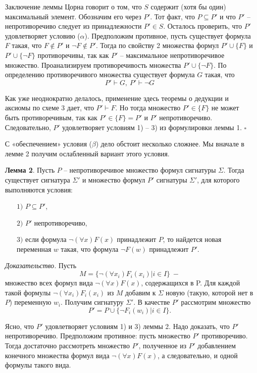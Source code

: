 \documentclass[a4paper]{article}
\begin{document}
Заключение леммы Цорна говорит о том, что $S$ содержит (хотя бы один) максимальный элемент. Обозначим его через $P'$. Тот факт, что $P \subseteq P'$ и что $P'$ – непротиворечиво следует из принадлежности $P' \in S$. Осталось проверить, что $P'$ удовлетворяет условию ($\alpha$).  Предположим противное, пусть существует формула $F$ такая, что $F \notin P'$ и $\neg F \notin P'$. Тогда по свойству 2 множества формул $P' \cup \{F\}$ и $P' \cup \{\neg F\}$ противоречивы, так как $P'$ – максимальное непротиворечивое множество. Проанализируем противоречивость множества $P' \cup \{\neg F\}$. По определению противоречивого множества существует формула $G$ такая, что
$$
P' \vdash G,\ P' \vdash \neg G %
$$

Как уже неоднократно делалось, применение здесь теоремы о дедукции и аксиомы по схеме 3 дает, что $P' \vdash F$. Но тогда множество $P' \in \{F\}$ не может быть противоречивым, так как $P' \in \{F\} = P'$ и $P'$ непротиворечиво. Следовательно, $P'$ удовлетворяет условиям 1) – 3) из формулировки леммы 1. $\square$


С «обеспечением» условия ($\beta$) дело обстоит несколько сложнее. Мы вначале в лемме 2 получим ослабленный вариант этого условия.

\textbf{Лемма 2}. Пусть $P$ – непротиворечивое множество формул сигнатуры $\Sigma$. Тогда существует сигнатура $\Sigma'$ и множество формул $P'$ сигнатуры $\Sigma'$, для которого выполняются условия:
\begin{itemize}
	\item [$1)$] $P \subseteq P'$,
	\item [$2)$] $P'$ непротиворечиво,
	\item [$3)$] если формула $\neg (\forall x)F(x)$ принадлежит $P$, то найдется новая переменная $w$ такая, что формула $\neg F(w)$ принадлежит $P'$.
\end{itemize}

\textit{Доказательство.} Пусть
$$
M = \{ \neg (\forall x_i)F_i(x_i) | i \in I \} \ -
$$
множество всех формул вида $\neg (\forall x)F(x)$, содержащихся в P. Для каждой такой формулы $\neg (\forall x_i)F_i(x_i)$ из $M$ добавим к $\Sigma$ новую (такую, которой нет в $P$) переменную $w_i$. Получим сигнатуру $\Sigma'$. В качестве $P'$ рассмотрим множество
$$
P' = P \cup \{ \neg F_i(w_i) | i \in I \}.
$$


Ясно, что $P'$ удовлетворяет условиям 1) и 3) леммы 2. Надо доказать, что $P'$ непротиворечиво. Предположим противное: пусть множество $P'$ противоречиво. Тогда достаточно рассмотреть множество $P'$, полученное из $P'$ добавлением конечного множества формул вида $\neg (\forall x)F(x)$, а следовательно, и одной формулы такого вида. 
\end{document}
